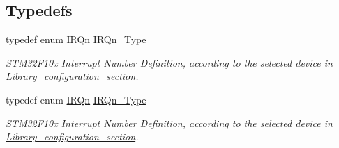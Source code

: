 \subsection*{Typedefs}
\begin{DoxyCompactItemize}
\item 
typedef enum \hyperlink{group___configuration__section__for___c_m_s_i_s_ga666eb0caeb12ec0e281415592ae89083}{I\+R\+Qn} \hyperlink{group___configuration__section__for___c_m_s_i_s_gac3af4a32370fb28c4ade8bf2add80251}{I\+R\+Qn\+\_\+\+Type}
\begin{DoxyCompactList}\small\item\em S\+T\+M32\+F10x Interrupt Number Definition, according to the selected device in \hyperlink{group___library__configuration__section}{Library\+\_\+configuration\+\_\+section}. \end{DoxyCompactList}\item 
typedef enum \hyperlink{group___configuration__section__for___c_m_s_i_s_ga666eb0caeb12ec0e281415592ae89083}{I\+R\+Qn} \hyperlink{group___configuration__section__for___c_m_s_i_s_gac3af4a32370fb28c4ade8bf2add80251}{I\+R\+Qn\+\_\+\+Type}
\begin{DoxyCompactList}\small\item\em S\+T\+M32\+F10x Interrupt Number Definition, according to the selected device in \hyperlink{group___library__configuration__section}{Library\+\_\+configuration\+\_\+section}. \end{DoxyCompactList}\end{DoxyCompactItemize}
